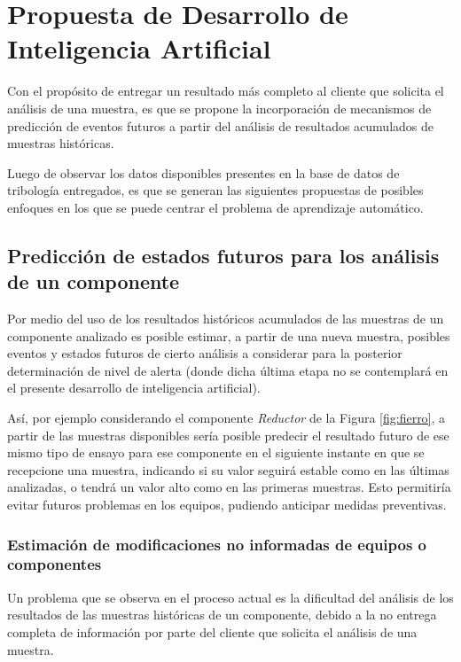 \documentclass{article}
\begin{document}
\newpage
\section{Propuesta de Desarrollo de Inteligencia Artificial}

Con el propósito de entregar un resultado más completo al cliente que solicita el análisis de una muestra, es que se propone la incorporación de mecanismos de predicción de eventos futuros a partir del análisis de resultados acumulados de muestras históricas. 

Luego de observar los datos disponibles presentes en la base de datos de tribología entregados, es que se generan las siguientes propuestas de posibles enfoques en los que se puede centrar el problema de aprendizaje automático.

\subsection{Predicción de estados futuros para los an\'alisis de un componente}

Por medio del uso de los resultados históricos acumulados de las muestras de un componente analizado es posible estimar, a partir de una nueva muestra, posibles eventos y estados futuros de cierto an\'alisis a considerar para la posterior determinaci\'on de nivel de alerta (donde dicha \'ultima etapa no se contemplar\'a en el presente desarrollo de inteligencia artificial).

As\'i, por ejemplo considerando el componente \textit{Reductor} de la Figura \ref{fig:fierro}, a partir de las muestras disponibles ser\'ia posible predecir el resultado futuro de ese mismo tipo de ensayo para ese componente en el siguiente instante en que se recepcione una muestra, indicando si su valor seguir\'a estable como en las \'ultimas analizadas, o tendr\'a un valor alto como en las primeras muestras. Esto permitir\'ia evitar futuros problemas en los equipos, pudiendo anticipar medidas preventivas.


\subsubsection{Estimación de modificaciones no informadas de equipos o componentes}

Un problema que se observa en el proceso actual es la dificultad del análisis de los resultados de las muestras históricas de un componente, debido a la no entrega completa de información por parte del cliente que solicita el análisis de una muestra.
\end{document}
